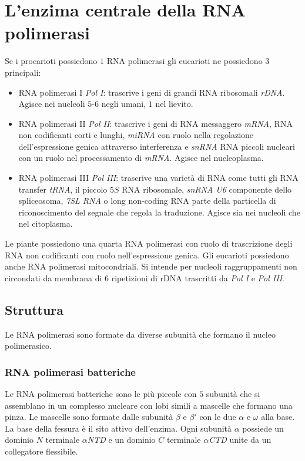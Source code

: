 \section{L'enzima centrale della RNA polimerasi}
Se i procarioti possiedono $1$ RNA polimerasi gli eucarioti ne possiedono $3$ principali:
\begin{itemize}
	\item RNA polimerasi I \emph{Pol I}: trascrive i geni di grandi RNA ribosomali \emph{rDNA}. Agisce nei nucleoli $5$-$6$ negli umani, $1$ nel lievito.
	\item RNA polimerasi II \emph{Pol II}: trascrive i geni di RNA messaggero \emph{mRNA}, RNA non codificanti corti e lunghi, \emph{miRNA} con ruolo nella regolazione 
		dell'espressione genica attraverso interferenza e \emph{snRNA} RNA piccoli nucleari con un ruolo nel processamento di \emph{mRNA}. Agisce nel nucleoplasma.
	\item RNA polimerasi III \emph{Pol III}: trascrive una variet\`a di RNA come tutti gli RNA transfer \emph{tRNA}, il piccolo $5S$ RNA ribosomale, \emph{snRNA U6} componente 
		dello spliceosoma, \emph{7SL RNA} o long non-coding RNA parte della particella di riconoscimento del segnale che regola la traduzione. Agisce sia nei nucleoli che nel
		citoplasma.
\end{itemize}
Le piante possiedono una quarta RNA polimerasi con ruolo di trascrizione degli RNA non codificanti con ruolo nell'espressione genica. Gli eucarioti possiedono anche RNA polimerasi 
mitocondriali. Si intende per nucleoli raggruppamenti non circondati da membrana di $6$ ripetizioni di rDNA trascritti da \emph{Pol I} e \emph{Pol III}. 
\subsection{Struttura}
Le RNA polimerasi sono formate da diverse subunit\`a che formano il nucleo polimerasico. 
\subsubsection{RNA polimerasi batteriche}
Le RNA polimerasi batteriche sono le pi\`u piccole con $5$ subunit\`a che si assemblano in un complesso nucleare con lobi simili a mascelle che formano una pinza. Le mascelle sono formate
dalle subunit\`a $\beta$ e $\beta'$ con le due $\alpha$ e $\omega$ alla base. La base della fessura \`e il sito attivo dell'enzima. Ogni subunit\`a $\alpha$ possiede un dominio $N$ 
terminale \emph{$\alpha$NTD} e un dominio $C$ terminale \emph{$\alpha$CTD} unite da un collegatore flessibile. 
